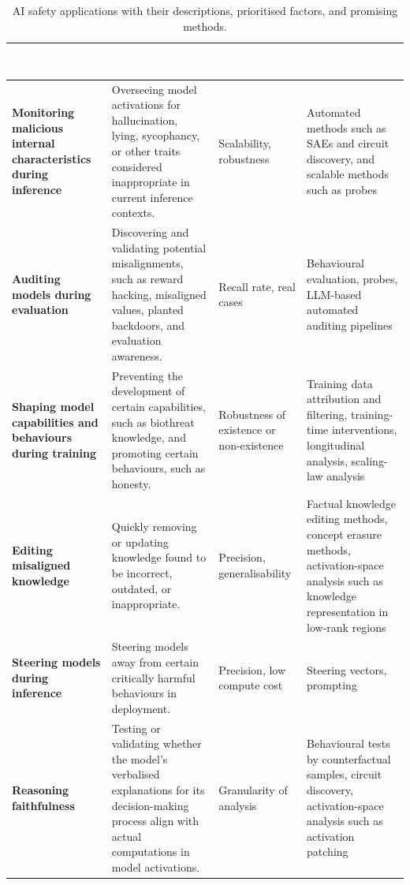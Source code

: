 \begin{table}[tb]
\centering
\caption{AI safety applications with their descriptions, prioritised factors, and promising methods.}
\label{tab:mi_safety_applications}
\renewcommand{\arraystretch}{1.3}
\small
\begin{tabular}{
    >{\raggedright\arraybackslash}p{3.0cm}
    >{\raggedright\arraybackslash}p{4.5cm}
    >{\raggedright\arraybackslash}p{3.0cm}
    >{\raggedright\arraybackslash}p{5.0cm}
}
\toprule
\rowcolor{tableheader!80}
\textcolor{white}{\textbf{Safety Applications}} &
\textcolor{white}{\textbf{Descriptions}} &
\textcolor{white}{\textbf{Prioritised Factors}} &
\textcolor{white}{\textbf{Promising Methods}} \\
\midrule

\rowcolor{tablerow1}
\textbf{Monitoring malicious internal characteristics during inference}
&
Overseeing model activations for hallucination, lying, sycophancy, or other traits considered inappropriate in current inference contexts.
&
Scalability, robustness
&
Automated methods such as SAEs and circuit discovery, and scalable methods such as probes
\\

\rowcolor{tablerow2}
\textbf{Auditing models during evaluation}
&
Discovering and validating potential misalignments, such as reward hacking, misaligned values, planted backdoors, and evaluation awareness.
&
Recall rate, real cases
&
Behavioural evaluation, probes, LLM-based automated auditing pipelines
\\

\rowcolor{tablerow1}
\textbf{Shaping model capabilities and behaviours during training}
&
Preventing the development of certain capabilities, such as biothreat knowledge, and promoting certain behaviours, such as honesty.
&
Robustness of existence or non-existence
&
Training data attribution and filtering, training-time interventions, longitudinal analysis, scaling-law analysis
\\

\rowcolor{tablerow2}
\textbf{Editing misaligned knowledge}
&
Quickly removing or updating knowledge found to be incorrect, outdated, or inappropriate.
&
Precision, generalisability
&
Factual knowledge editing methods, concept erasure methods, activation-space analysis such as knowledge representation in low-rank regions
\\

\rowcolor{tablerow1}
\textbf{Steering models during inference}
&
Steering models away from certain critically harmful behaviours in deployment.
&
Precision, low compute cost
&
Steering vectors, prompting
\\

\rowcolor{tablerow2}
\textbf{Reasoning faithfulness}
&
Testing or validating whether the model’s verbalised explanations for its decision-making process align with actual computations in model activations.
&
Granularity of analysis
&
Behavioural tests by counterfactual samples, circuit discovery, activation-space analysis such as activation patching
\\

\bottomrule
\end{tabular}
\end{table}

